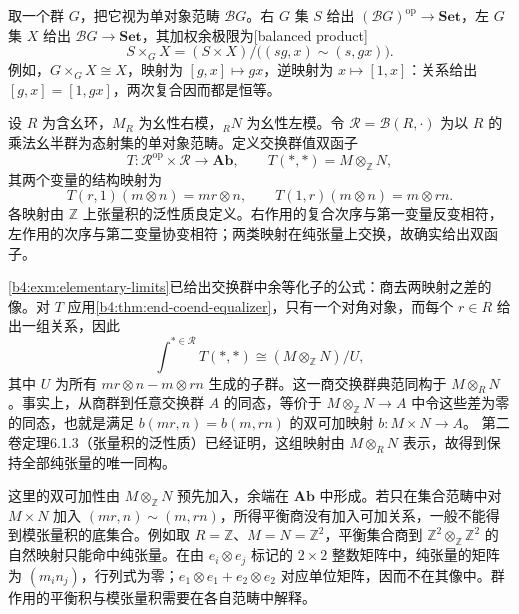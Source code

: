 取一个群 \(G\)，把它视为单对象范畴 \(\mathcal BG\)。右 \(G\) 集 \(S\) 给出 \((\mathcal BG)^{\mathrm{op}}\rightarrow\mathbf{Set}\)，左 \(G\) 集 \(X\) 给出 \(\mathcal BG\rightarrow\mathbf{Set}\)，其加权余极限为[balanced product]
\[
	S\times_GX=(S\times X)/\bigl((sg,x)\sim(s,gx)\bigr).
\]
例如，\(G\times_GX\cong X\)，映射为 \([g,x]\mapsto gx\)，逆映射为 \(x\mapsto[1,x]\)：关系给出 \([g,x]=[1,gx]\)，两次复合因而都是恒等。

\begin{example}[模张量积是交换群中的余端]\label{b4:exm:tensor-product-coend}
	设 \(R\) 为含幺环，\(M_R\) 为幺性右模，\({}_RN\) 为幺性左模。令 \(\mathcal R=\mathcal B(R,\cdot)\) 为以 \(R\) 的乘法幺半群为态射集的单对象范畴。定义交换群值双函子
	\[
		T:\mathcal R^{\mathrm{op}}\times\mathcal R\longrightarrow\mathbf{Ab},
		\qquad T(*,*)=M\otimes_{\mathbb Z}N,
	\]
	其两个变量的结构映射为
	\[
		T(r,1)(m\otimes n)=mr\otimes n,\qquad
		T(1,r)(m\otimes n)=m\otimes rn.
	\]
	各映射由 \(\mathbb Z\) 上张量积的泛性质良定义。右作用的复合次序与第一变量反变相符，左作用的次序与第二变量协变相符；两类映射在纯张量上交换，故确实给出双函子。

	\ProseParagraphBreak
	\cref{b4:exm:elementary-limits}已给出交换群中余等化子的公式：商去两映射之差的像。对 \(T\) 应用\cref{b4:thm:end-coend-equalizer}，只有一个对角对象，而每个 \(r\in R\) 给出一组关系，因此
	\[
		\int^{*\in\mathcal R}T(*,*)
		\cong(M\otimes_{\mathbb Z}N)/U,
	\]
	其中 \(U\) 为所有 \(mr\otimes n-m\otimes rn\) 生成的子群。这一商交换群典范同构于 \(M\otimes_RN\)。事实上，从商群到任意交换群 \(A\) 的同态，等价于 \(M\otimes_{\mathbb Z}N\rightarrow A\) 中令这些差为零的同态，也就是满足 \(b(mr,n)=b(m,rn)\) 的双可加映射 \(b:M\times N\rightarrow A\)。
	第二卷定理6.1.3（张量积的泛性质）已经证明，这组映射由 \(M\otimes_RN\) 表示，故得到保持全部纯张量的唯一同构。

	\ProseParagraphBreak
	这里的双可加性由 \(M\otimes_{\mathbb Z}N\) 预先加入，余端在 \(\mathbf{Ab}\) 中形成。若只在集合范畴中对 \(M\times N\) 加入 \((mr,n)\sim(m,rn)\)，所得平衡商没有加入可加关系，一般不能得到模张量积的底集合。例如取 \(R=\mathbb Z\)、\(M=N=\mathbb Z^2\)，平衡集合商到 \(\mathbb Z^2\otimes_{\mathbb Z}\mathbb Z^2\) 的自然映射只能命中纯张量。在由 \(e_i\otimes e_j\) 标记的 \(2\times2\) 整数矩阵中，纯张量的矩阵为 \((m_in_j)\)，行列式为零；\(e_1\otimes e_1+e_2\otimes e_2\) 对应单位矩阵，因而不在其像中。群作用的平衡积与模张量积需要在各自范畴中解释。
\end{example}


